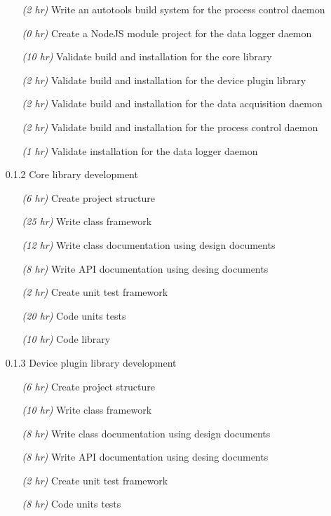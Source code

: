 \begin{itemize}
\begin{itemize}
          \item[\emph{(2 hr)}] Write an autotools build system for the process control daemon
          \item[\emph{(0 hr)}] Create a NodeJS module project for the data logger daemon
          \item[\emph{(10 hr)}] Validate build and installation for the core library
          \item[\emph{(2 hr)}] Validate build and installation for the device plugin library
          \item[\emph{(2 hr)}] Validate build and installation for the data acquisition daemon
          \item[\emph{(2 hr)}] Validate build and installation for the process control daemon
          \item[\emph{(1 hr)}] Validate installation for the data logger daemon
        \end{itemize}
      \item[0.1.2] Core library development
        \begin{itemize}
          \item[\emph{(6 hr)}] Create project structure
          \item[\emph{(25 hr)}] Write class framework
          \item[\emph{(12 hr)}] Write class documentation using design documents
          \item[\emph{(8 hr)}] Write API documentation using desing documents
          \item[\emph{(2 hr)}] Create unit test framework
          \item[\emph{(20 hr)}] Code units tests
          \item[\emph{(10 hr)}] Code library
        \end{itemize}
      \item[0.1.3] Device plugin library development
        \begin{itemize}
          \item[\emph{(6 hr)}] Create project structure
          \item[\emph{(10 hr)}] Write class framework
          \item[\emph{(8 hr)}] Write class documentation using design documents
          \item[\emph{(8 hr)}] Write API documentation using desing documents
          \item[\emph{(2 hr)}] Create unit test framework
          \item[\emph{(8 hr)}] Code units tests

\end{itemize}
\end{itemize}
